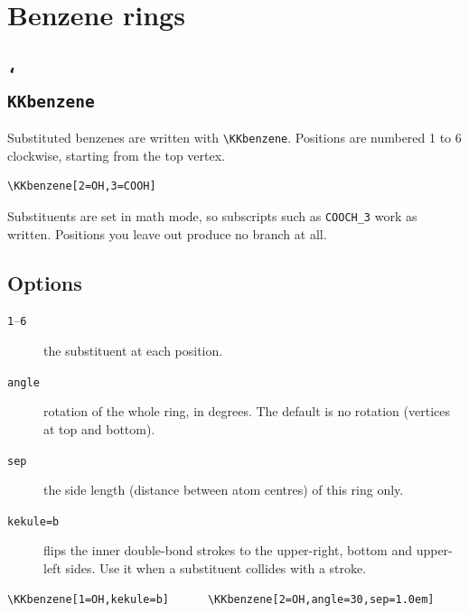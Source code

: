 \documentclass[paper=a4paper,fontsize=10pt]{jlreq}
\begin{document}
\section{Benzene rings}

\subsection{\texttt{\char`\\KKbenzene}}

Substituted benzenes are written with \verb|\KKbenzene|. Positions are numbered
1 to 6 clockwise, starting from the top vertex.

\begin{verbatim}
\KKbenzene[2=OH,3=COOH]
\end{verbatim}

\begin{center}
\KKbenzene[2=OH,3=COOH]\qquad
\KKbenzene[1=COOH,4=COOH]\qquad
\KKbenzene[]
\end{center}

Substituents are set in math mode, so subscripts such as \verb|COOCH_3| work as
written. Positions you leave out produce no branch at all.

\subsection{Options}

\begin{description}
\item[\texttt{1}--\texttt{6}] the substituent at each position.
\item[\texttt{angle}] rotation of the whole ring, in degrees. The default is no
      rotation (vertices at top and bottom).
\item[\texttt{sep}] the side length (distance between atom centres) of this ring only.
\item[\texttt{kekule=b}] flips the inner double-bond strokes to the upper-right,
      bottom and upper-left sides. Use it when a substituent collides with a stroke.
\end{description}

\begin{verbatim}
\KKbenzene[1=OH,kekule=b]      \KKbenzene[2=OH,angle=30,sep=1.0em]
\end{verbatim}

\begin{center}
\KKbenzene[1=OH,kekule=b]\qquad
\KKbenzene[2=OH,angle=30,sep=1.0em]
\end{center}
\end{document}
